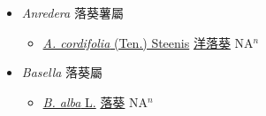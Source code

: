 
  \begin{itemize}
 \item[] \textit{Anredera} 落葵薯屬
                    
  \begin{itemize}
        \item[] \href{http://www.theplantlist.org/tpl1.1/search?q=Anredera+cordifolia}{\textit{A. cordifolia} (Ten.) Steenis}   \href{\detokenize{http://taibnet.sinica.edu.tw/chi/taibnet_species_list.php?T2=洋落葵&T2_new_value=true&fr=y}}{洋落葵} NA$^n$
  \end{itemize}
 \item[] \textit{Basella} 落葵屬
                    
  \begin{itemize}
        \item[] \href{http://www.theplantlist.org/tpl1.1/search?q=Basella+alba}{\textit{B. alba} L.}   \href{\detokenize{http://taibnet.sinica.edu.tw/chi/taibnet_species_list.php?T2=落葵&T2_new_value=true&fr=y}}{落葵} NA$^n$
  \end{itemize}
  \end{itemize}
